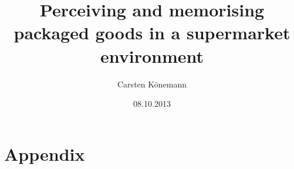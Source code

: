 \documentclass{thesis}
\begin{document}
  \title{Perceiving and memorising packaged goods in a supermarket environment}
  \author{Carsten K\"onemann}
  \date{08.10.2013}
  
  

  \pagestyle{empty}
  
  \null\clearpage
  
  
  
  \null\cleardoublepage
  \null\clearpage

  

  \clearpage
  \pagestyle{plain}
  
  \tableofcontents

  \clearpage
  \pagestyle{mystyle}
  \setlength{\parskip}{2mm}

  

  

  

  

  

  

  
  
  \renewcommand{\chaptername}{Appendix}
  \renewcommand{\thechapter}{\Alph{chapter}}
  \setcounter{chapter}{0}
  \setlength{\parskip}{1mm}
  
  \chapter{Appendix}
    \listoffigures
    \lstlistoflistings
    \listoftables

  
  

  
\end{document}
